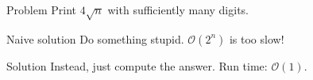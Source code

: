 \begin{frame}
    \frametitle{\problemtitle}
    \begin{block}{Problem}
        Print $4\sqrt n$ with sufficiently many digits.
    \end{block}
    \pause
    \begin{block}{Naive solution}
        Do something stupid.
        $\mathcal O(2^n)$ is too slow!
    \end{block}
    \pause
    \begin{block}{Solution}
        Instead, just compute the answer.
        Run time: $\mathcal O(1)$.
    \end{block}
    \pause
    \solvestats
\end{frame}

